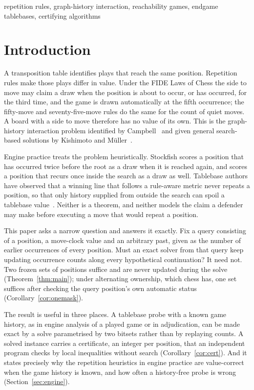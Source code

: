 \documentclass[journal]{IEEEtran}
\theoremstyle{definition}
\theoremstyle{remark}
\begin{document}
\begin{IEEEkeywords}
repetition rules, graph-history interaction, reachability games, endgame tablebases, certifying algorithms
\end{IEEEkeywords}

\section{Introduction}

A transposition table identifies plays that reach the same position. Repetition rules make those plays differ in value. Under the FIDE Laws of Chess the side to move may claim a draw when the position is about to occur, or has occurred, for the third time, and the game is drawn automatically at the fifth occurrence; the fifty-move and seventy-five-move rules do the same for the count of quiet moves. A board with a side to move therefore has no value of its own. This is the graph-history interaction problem identified by Campbell~\cite{campbell1985} and given general search-based solutions by Kishimoto and M\"uller~\cite{kishimoto2004,kishimoto2005}.

Engine practice treats the problem heuristically. Stockfish scores a position that has occurred twice before the root as a draw when it is reached again, and scores a position that recurs once inside the search as a draw as well. Tablebase authors have observed that a winning line that follows a rule-aware metric never repeats a position, so that only history supplied from outside the search can spoil a tablebase value~\cite{deman2018}. Neither is a theorem, and neither models the claim a defender may make before executing a move that would repeat a position.

This paper asks a narrow question and answers it exactly. Fix a query consisting of a position, a move-clock value and an arbitrary past, given as the number of earlier occurrences of every position. Must an exact solver from that query keep updating occurrence counts along every hypothetical continuation? It need not. Two frozen sets of positions suffice and are never updated during the solve (Theorem~\ref{thm:main}); under alternating ownership, which chess has, one set suffices after checking the query position's own automatic status (Corollary~\ref{cor:onemask}).

The result is useful in three places. A tablebase probe with a known game history, as in engine analysis of a played game or in adjudication, can be made exact by a solve parametrised by two bitsets rather than by replaying counts. A solved instance carries a certificate, an integer per position, that an independent program checks by local inequalities without search (Corollary~\ref{cor:cert}). And it states precisely why the repetition heuristics in engine practice are value-correct when the game history is known, and how often a history-free probe is wrong (Section~\ref{sec:engine}).
\end{document}
